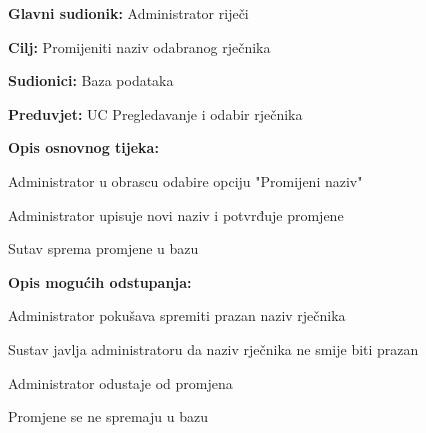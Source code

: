 \noindent {}
\begin{packed_item}

	\item \textbf{Glavni sudionik: } Administrator riječi
	\item \textbf{Cilj: } Promijeniti naziv odabranog rječnika
	\item \textbf{Sudionici: } Baza podataka
	\item \textbf{Preduvjet: } UC Pregledavanje i odabir rječnika
	\item  \textbf{Opis osnovnog tijeka:}
	
	\item[] \begin{packed_enum}
		
		\item Administrator u obrascu odabire opciju "Promijeni naziv"
		\item Administrator upisuje novi naziv i potvrđuje promjene
		\item Sutav sprema promjene u bazu

	\end{packed_enum}

	\item  \textbf{Opis mogućih odstupanja:}
	
	\item[] \begin{packed_item}

		\item[2.a] Administrator pokušava spremiti prazan naziv rječnika
		\item[] \begin{packed_enum}
			
			\item Sustav javlja administratoru da naziv rječnika ne smije biti prazan
			
		\end{packed_enum}

		\item[2.b] Administrator odustaje od promjena
		\item[] \begin{packed_enum}
			
			\item Promjene se ne spremaju u bazu
			
		\end{packed_enum}
		
	\end{packed_item}

\end{packed_item}

